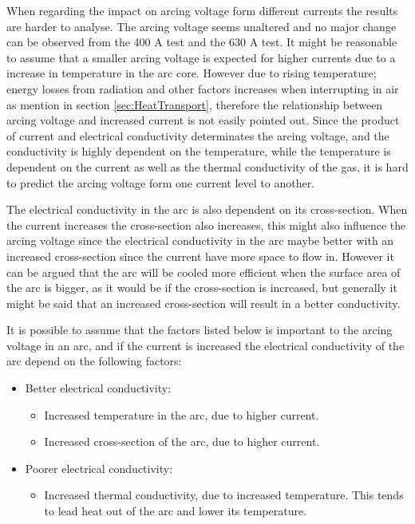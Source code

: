\documentclass[10pt,a4paper,twoside]{article}
\begin{document}
When regarding the impact on arcing voltage form different currents the results are harder to analyse. The arcing voltage seems unaltered and no major change can be observed from the 400 A test and the 630 A test. It might be reasonable to assume that a smaller arcing voltage is expected for higher currents due to a increase in temperature in the arc core. However due to rising temperature; energy losses from radiation and other factors increases when interrupting in air as mention in section \ref{sec:HeatTransport}, therefore the relationship between arcing voltage and increased current is not easily pointed out. Since the product of current and electrical conductivity determinates the arcing voltage, and the conductivity is highly dependent on the temperature, while the temperature is dependent on the current as well as the thermal conductivity of the gas, it is hard to predict the arcing voltage form one current level to another.

The electrical conductivity in the arc is also dependent on its cross-section. When the current increases the cross-section also increases, this might also influence the arcing voltage since the electrical conductivity in the arc maybe better with an increased cross-section since the current have more space to flow in. However it can be argued that the arc will be cooled more efficient when the surface area of the arc is bigger, as it would be if the cross-section is increased, but generally it might be said that an increased cross-section will result in a better conductivity.

It is possible to assume that the factors listed below is important to the arcing voltage in an arc, and if the current is increased the electrical conductivity of the arc depend on the following factors: 
\begin{itemize}
\item[] Better electrical conductivity:
	\begin{itemize}
		\item Increased temperature in the arc, due to higher current.
		\item Increased cross-section of the arc, due to higher current.
	\end{itemize}
\item[] Poorer electrical conductivity:
	\begin{itemize}
		\item Increased thermal conductivity, due to increased temperature. This tends to lead heat out of the arc and lower its temperature.
	\end{itemize}		 
\end{itemize} 
\end{document}
